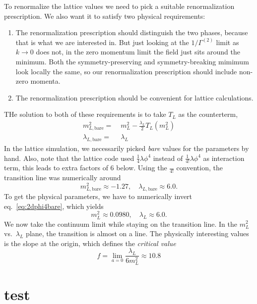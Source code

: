 \documentclass[12pt]{article}
\begin{document}
To renormalize the lattice values we need to pick a suitable
renormalization prescription. We also want it to satisfy two physical
requirements:
\begin{enumerate}
\item The renormalization prescription should distinguish the two
  phases, because that is what we are interested in. But just looking
  at the $1/\Gamma^{(2)}$ limit as $k\to 0$ does not, in the zero
  momentum limit the field just sits around the minimum. Both the
  symmetry-preserving and symmetry-breaking mimimum look locally the
  same, so our renormalization prescription should include non-zero
  momenta.
\item The renormalization prescription should be convenient for
  lattice calculations.
\end{enumerate}
THe solution to both of these requirements is to take $T_L$ as the
counterterm,
\begin{equation}
  \label{eq:2dphi4bare}
  \begin{split}
    m^2_{L, \text{bare}} =&\; m_L^2 - \frac{\lambda_L}{2} T_L(m^2_L)
    \\ 
    \lambda_{L, \text{bare}} =&\; \lambda_L
  \end{split}
\end{equation}
In the lattice simulation, we necessarily picked \emph{bare} values
for the parameters by hand. Also, note that the lattice code used
$\frac{1}{4}\lambda \phi^4$ instead of $\frac{1}{4!}\lambda \phi^4$ as
interaction term, this leads to extra factors of $6$ below. Using the
$\frac{}{4!}$ convention, the transition line was numerically around
\begin{equation}
  m^2_{L,\text{bare}} \approx -1.27
  ,\quad
  \lambda_{L, \text{bare}} \approx 6.0.
\end{equation}
To get the physical parameters, we have to numerically invert
eq.~\eqref{eq:2dphi4bare}, which yields
\begin{equation}
  m_L^2 \approx 0.0980
  ,\quad
  \lambda_L \approx 6.0
  .
\end{equation}
We now take the continuum limit while staying on the transition
line. In the $m_L^2$ vs.\ $\lambda_L$ plane, the transition is almost
on a line. The physically interesting values is the slope at the
origin, which defines the \emph{critical value}
\begin{equation}
  f = \lim_{a=0} 
  \frac{\lambda_L}{6 m^2_L}
  \approx
  10.8
\end{equation}





\newpage
\appendix

\section{test}



 
\renewcommand{\refname}{Bibliography}

\end{document}
